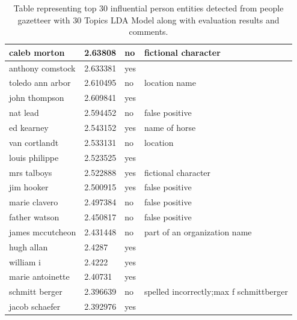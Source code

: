 \documentclass[letterpaper,11pt]{report}
\begin{document}
\begin{table}[!h]
\begin{tabular}{|l|l|p{3cm}|p{3cm}|}
caleb morton     & 2.63808  & no                 & fictional character                  \\ \hline
anthony comstock & 2.633381 & yes                &                                      \\ \hline
toledo ann arbor & 2.610495 & no                 & location name                            \\ \hline
john thompson    & 2.609841 & yes                &                                      \\ \hline
nat lead         & 2.594452 & no                 & false positive                       \\ \hline
ed kearney       & 2.543152 & yes                & name of horse                        \\ \hline
van cortlandt    & 2.533131 & no                 & location                             \\ \hline
louis philippe   & 2.523525 & yes                &                                      \\ \hline
mrs talboys      & 2.522888 & yes                & fictional character                  \\ \hline
jim hooker       & 2.500915 & yes                & false positive                       \\ \hline
marie clavero    & 2.497384 & no                 & false positive                       \\ \hline
father watson    & 2.450817 & no                 & false positive                       \\ \hline
james mccutcheon & 2.431448 & no                 & part of an organization name                      \\ \hline
hugh allan       & 2.4287   & yes                &                                      \\ \hline
william i        & 2.4222   & yes                &                                      \\ \hline
marie antoinette & 2.40731  & yes                &                                      \\ \hline
schmitt berger   & 2.396639 & no                 & spelled incorrectly;max f schmittberger                       \\ \hline
jacob schaefer   & 2.392976 & yes                &                                      \\ \hline
             
\end{tabular}
\caption{Table representing top 30 influential person entities detected from people gazetteer with 30 Topics LDA Model along with evaluation results and comments.}
\label{table:app1}
\end{table}
\end{document}
